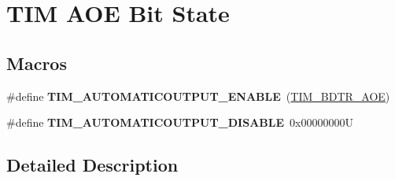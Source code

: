 \hypertarget{group___t_i_m___a_o_e___bit___set___reset}{}\section{T\+IM A\+OE Bit State}
\label{group___t_i_m___a_o_e___bit___set___reset}
\subsection*{Macros}
\begin{DoxyCompactItemize}
\item 
\mbox{\label{group___t_i_m___a_o_e___bit___set___reset_ga09e7f3f768b0f122f13fd47771f07ddf}} 
\#define {\bfseries T\+I\+M\+\_\+\+A\+U\+T\+O\+M\+A\+T\+I\+C\+O\+U\+T\+P\+U\+T\+\_\+\+E\+N\+A\+B\+LE}~(\mbox{\hyperlink{group___peripheral___registers___bits___definition_ga59f15008050f91fa3ecc9eaaa971a509}{T\+I\+M\+\_\+\+B\+D\+T\+R\+\_\+\+A\+OE}})
\item 
\mbox{\label{group___t_i_m___a_o_e___bit___set___reset_ga65b4336dee767fbe8d8cc4f980f6b18e}} 
\#define {\bfseries T\+I\+M\+\_\+\+A\+U\+T\+O\+M\+A\+T\+I\+C\+O\+U\+T\+P\+U\+T\+\_\+\+D\+I\+S\+A\+B\+LE}~0x00000000U
\end{DoxyCompactItemize}


\subsection{Detailed Description}
